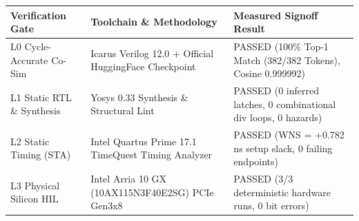 \documentclass[11pt,a4paper]{article}
\begin{document}
{\footnotesize\renewcommand{\arraystretch}{1.14}\begin{longtable}{@{}L{0.24\textwidth}L{0.34\textwidth}L{0.34\textwidth}@{}}\toprule

\textbf{Verification Gate} & \textbf{Toolchain \& Methodology} & \textbf{Measured Signoff Result}\\\midrule\endhead

L0 Cycle-Accurate Co-Sim & Icarus Verilog 12.0 +\allowbreak{} Official HuggingFace Checkpoint & PASSED (\allowbreak{}100\% Top-1 Match (\allowbreak{}382/\allowbreak{}382 Tokens)\allowbreak{},\allowbreak{} Cosine 0.999992)\allowbreak{}\\[2pt]

L1 Static RTL \& Synthesis & Yosys 0.33 Synthesis \& Structural Lint & PASSED (\allowbreak{}0 inferred latches,\allowbreak{} 0 combinational div loops,\allowbreak{} 0 hazards)\allowbreak{}\\[2pt]

L2 Static Timing (\allowbreak{}STA)\allowbreak{} & Intel Quartus Prime 17.1 TimeQuest Timing Analyzer & PASSED (\allowbreak{}WNS =\allowbreak{} +\allowbreak{}0.782 ns setup slack,\allowbreak{} 0 failing endpoints)\allowbreak{}\\[2pt]

L3 Physical Silicon HIL & Intel Arria 10 GX (\allowbreak{}10AX115N\allowbreak{}3F40E2SG)\allowbreak{} PCIe Gen3x8 & PASSED (\allowbreak{}3/\allowbreak{}3 deterministic hardware runs,\allowbreak{} 0 bit errors)\allowbreak{}\\[2pt]

\bottomrule\end{longtable}}
\end{document}
